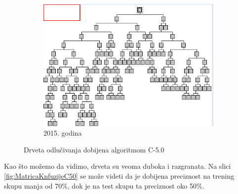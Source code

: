 \documentclass[a4paper]{article}
\begin{document}
\begin{figure}[H]
	\vspace{0.5cm}
	\begin{subfigure}[h]{\textwidth}
		\begin{center}
			\includegraphics[scale=0.70]{Klasifikacija/C50/MapaDrvetaOdlucivanja2015.png}
		\end{center}
		\caption{2015. godina}
		\label{fig:DrvoOdlucivanjaC502015}
	\end{subfigure}
	
	\caption{Drveta odlučivanja dobijena algoritmom C-5.0}
	\label{fig:DrvoOdlucivanjaC50}
\end{figure}

Kao što možemo da vidimo, drveta su veoma duboka i razgranata. Na slici \ref{fig:MatricaKnfuzijeC50} se može videti da je dobijena preciznost na trening skupu manja od 70\%, dok je na test skupu ta preciznost oko 50\%. 
\end{document}
